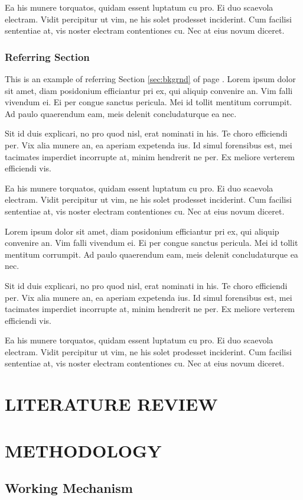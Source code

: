 Ea his munere torquatos, quidam essent luptatum cu pro. Ei duo scaevola electram. Vidit percipitur ut vim, ne his solet prodesset inciderint. Cum facilisi sententiae at, vis noster electram contentiones cu. Nec at eius novum diceret.
\subsection{Referring Section}
This is an example of referring Section \ref{sec:bkgrnd} of page \pageref{sec:bkgrnd}. Lorem ipsum dolor sit  amet, diam posidonium efficiantur pri ex, qui aliquip convenire an. Vim falli vivendum ei. Ei per congue sanctus pericula. Mei id tollit mentitum corrumpit. Ad paulo quaerendum eam, meis delenit concludaturque ea nec.\par
Sit id duis explicari, no pro quod nisl, erat nominati in his. Te choro efficiendi per. Vix alia munere an, ea aperiam expetenda ius. Id simul forensibus est, mei tacimates imperdiet incorrupte at, minim hendrerit ne per. Ex meliore verterem efficiendi vis.

Ea his munere torquatos, quidam essent luptatum cu pro. Ei duo scaevola electram. Vidit percipitur ut vim, ne his solet prodesset inciderint. Cum facilisi sententiae at, vis noster electram contentiones cu. Nec at eius novum diceret.

Lorem ipsum dolor sit  amet, diam posidonium efficiantur pri ex, qui aliquip convenire an. Vim falli vivendum ei. Ei per congue sanctus pericula. Mei id tollit mentitum corrumpit. Ad paulo quaerendum eam, meis delenit concludaturque ea nec.\par
Sit id duis explicari, no pro quod nisl, erat nominati in his. Te choro efficiendi per. Vix alia munere an, ea aperiam expetenda ius. Id simul forensibus est, mei tacimates imperdiet incorrupte at, minim hendrerit ne per. Ex meliore verterem efficiendi vis.

Ea his munere torquatos, quidam essent luptatum cu pro. Ei duo scaevola electram. Vidit percipitur ut vim, ne his solet prodesset inciderint. Cum facilisi sententiae at, vis noster electram contentiones cu. Nec at eius novum diceret.
\chapter{LITERATURE REVIEW}
\chapter{METHODOLOGY}
\section{Working Mechanism}
